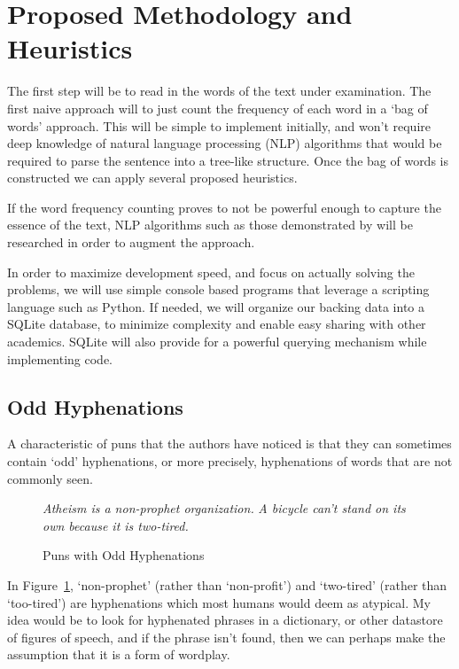 
\section{Proposed Methodology and Heuristics}
The first step will be to read in the words of the text under examination. The first naive approach will to just count the frequency of each word in a `bag of words' approach. This will be simple to implement initially, and won't require deep knowledge of natural language processing (NLP) algorithms that would be required to parse the sentence into a tree-like structure. Once the bag of words is constructed we can apply several proposed heuristics.

If the word frequency counting proves to not be powerful enough to capture the essence of the text, NLP algorithms such as those demonstrated by \cite{stanfordparser} will be researched in order to augment the approach. 

In order to maximize development speed, and focus on actually solving the problems, we will use simple console based programs that leverage a scripting language such as Python. If needed, we will organize our backing data into a SQLite database, to minimize complexity and enable easy sharing with other academics. SQLite will also provide for a powerful querying mechanism while implementing code.

\subsection{Odd Hyphenations}
A characteristic of puns that the authors have noticed is that they can sometimes contain `odd' hyphenations, or more precisely, hyphenations of words that are not commonly seen.

\begin{figure}[h]
\begin{mdframed}
  \emph{Atheism is a non-prophet organization.}
  \emph{A bicycle can't stand on its own because it is two-tired.}
  \caption{Puns with Odd Hyphenations}
 \label{oddhyphen}
\end{mdframed}
\end{figure}

In Figure~\ref{oddhyphen}, `non-prophet' (rather than `non-profit') and `two-tired' (rather than `too-tired') are hyphenations which most humans would deem as atypical. My idea would be to look for hyphenated phrases in a dictionary, or other datastore of figures of speech, and if the phrase isn't found, then we can perhaps make the assumption that it is a form of wordplay. 

